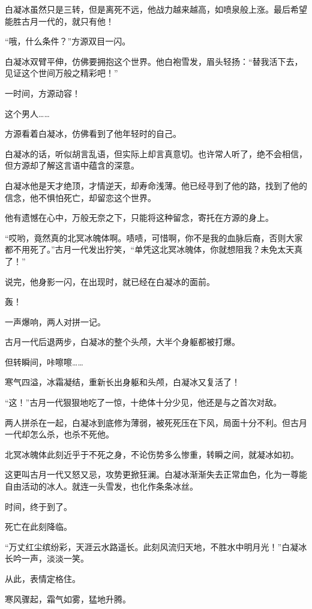 \begin{this_body}
白凝冰虽然只是三转，但是离死不远，他战力越来越高，如喷泉般上涨。最后希望能胜古月一代的，就只有他！

“哦，什么条件？”方源双目一闪。

白凝冰双臂平伸，仿佛要拥抱这个世界。他白袍雪发，眉头轻扬：“替我活下去，见证这个世间万般之精彩吧！”

一时间，方源动容！

这个男人……

方源看着白凝冰，仿佛看到了他年轻时的自己。

白凝冰的话，听似胡言乱语，但实际上却言真意切。也许常人听了，绝不会相信，但方源却了解这言语中蕴含的深意。

白凝冰他是天才绝顶，才情逆天，却寿命浅薄。他已经寻到了他的路，找到了他的信念，他不惧怕死亡，却留恋这个世界。

他有遗憾在心中，万般无奈之下，只能将这种留念，寄托在方源的身上。

“哎哟，竟然真的北冥冰魄体啊。啧啧，可惜啊，你不是我的血脉后裔，否则大家都不用死了。”古月一代发出狞笑，“单凭这北冥冰魄体，你就想阻我？未免太天真了！”

说完，他身影一闪，在出现时，就已经在白凝冰的面前。

轰！

一声爆响，两人对拼一记。

古月一代后退两步，白凝冰的整个头颅，大半个身躯都被打爆。

但转瞬间，咔嚓嚓……

寒气四溢，冰霜凝结，重新长出身躯和头颅，白凝冰又复活了！

“这！”古月一代狠狠地吃了一惊，十绝体十分少见，他还是与之首次对敌。

两人拼杀在一起，白凝冰到底修为薄弱，被死死压在下风，局面十分不利。但古月一代却怎么杀，也杀不死他。

北冥冰魄体此刻近乎于不死之身，不论伤势多么惨重，转瞬之间，就凝冰如初。

这更叫古月一代又怒又忌，攻势更掀狂澜。白凝冰渐渐失去正常血色，化为一尊能自由活动的冰人。就连一头雪发，也化作条条冰丝。

时间，终于到了。

死亡在此刻降临。

“万丈红尘缤纷彩，天涯云水路遥长。此刻风流归天地，不胜水中明月光！”白凝冰长吟一声，淡淡一笑。

从此，表情定格住。

寒风骤起，霜气如雾，猛地升腾。


\end{this_body}
